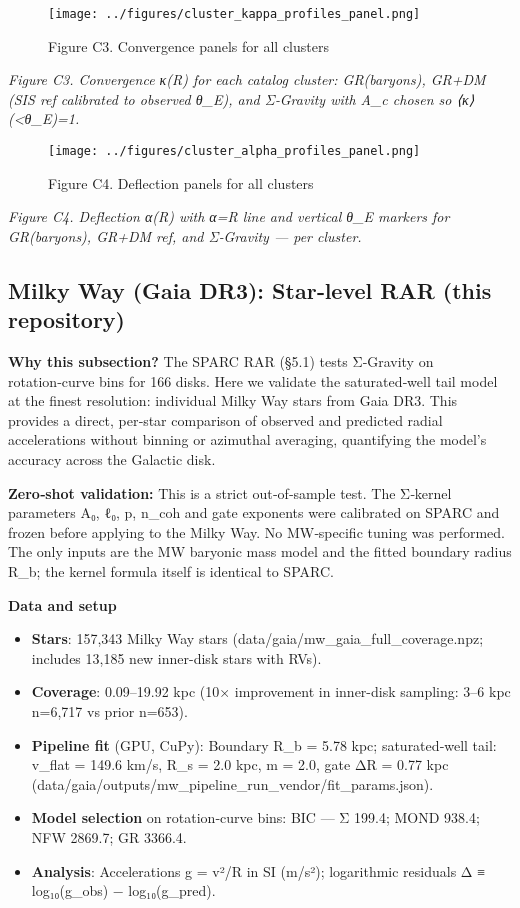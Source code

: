 \documentclass[11pt,a4paper]{article}
\begin{document}
\begin{figure}[h]
\centering
\texttt{[image: ../figures/cluster\_kappa\_profiles\_panel.png]}
\caption{Figure C3. Convergence panels for all clusters}
\end{figure}


\textit{Figure C3. Convergence κ(R) for each catalog cluster: GR(baryons), GR+DM (SIS ref calibrated to observed θ\_E), and Σ‑Gravity with A\_c chosen so ⟨κ⟩(<θ\_E)=1.}


\begin{figure}[h]
\centering
\texttt{[image: ../figures/cluster\_alpha\_profiles\_panel.png]}
\caption{Figure C4. Deflection panels for all clusters}
\end{figure}


\textit{Figure C4. Deflection α(R) with α=R line and vertical θ\_E markers for GR(baryons), GR+DM ref, and Σ‑Gravity — per cluster.}


\subsection{Milky Way (Gaia DR3): Star‑level RAR (this repository)}


\textbf{Why this subsection?} The SPARC RAR (§5.1) tests Σ‑Gravity on rotation‑curve bins for 166 disks. Here we validate the saturated‑well tail model at the finest resolution: individual Milky Way stars from Gaia DR3. This provides a direct, per‑star comparison of observed and predicted radial accelerations without binning or azimuthal averaging, quantifying the model's accuracy across the Galactic disk.


\textbf{Zero‑shot validation:} This is a strict out‑of‑sample test. The Σ‑kernel parameters {A₀, ℓ₀, p, n\_coh} and gate exponents were calibrated on SPARC and frozen before applying to the Milky Way. No MW‑specific tuning was performed. The only inputs are the MW baryonic mass model and the fitted boundary radius R\_b; the kernel formula itself is identical to SPARC.


\textbf{Data and setup}

\begin{itemize}
\item \textbf{Stars}: 157,343 Milky Way stars (data/gaia/mw\_gaia\_full\_coverage.npz; includes 13,185 new inner-disk stars with RVs).
\item \textbf{Coverage}: 0.09–19.92 kpc (10× improvement in inner-disk sampling: 3–6 kpc n=6,717 vs prior n=653).
\item \textbf{Pipeline fit} (GPU, CuPy): Boundary R\_b = 5.78 kpc; saturated‑well tail: v\_flat = 149.6 km/s, R\_s = 2.0 kpc, m = 2.0, gate ΔR = 0.77 kpc (data/gaia/outputs/mw\_pipeline\_run\_vendor/fit\_params.json).
\item \textbf{Model selection} on rotation‑curve bins: BIC — Σ 199.4; MOND 938.4; NFW 2869.7; GR 3366.4.
\item \textbf{Analysis}: Accelerations g = v²/R in SI (m/s²); logarithmic residuals Δ ≡ log₁₀(g\_obs) − log₁₀(g\_pred).
\end{itemize}
\end{document}
